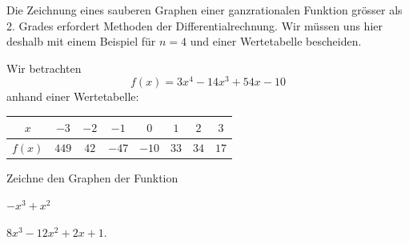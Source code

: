 \documentclass[%
11pt,%
twoside,%
titlepage,%
german,%
headsepline%
]{scrartcl}
\newcommand{\spaltenheight}{\rule{0mm}{3ex}}
\newcommand{\spaltensep}{\\[1ex]}
\begin{document}
Die Zeichnung eines sauberen Graphen einer ganzrationalen Funktion grösser als 2. Grades erfordert Methoden der Differentialrechnung. Wir müssen uns hier deshalb mit einem Beispiel für $n=4$ und einer Wertetabelle bescheiden.

\begin{bsp}
Wir betrachten
$$f(x)=3x^4-14x^3+54x-10$$
anhand einer Wertetabelle:
\begin{table}
\large
\centering
\begin{tabular}{|c|c|c|c|c|c|c|c|} \hline
\rowcolor{Gray}\spaltenheight  $x$ & $-3$ & $-2$ & $-1$ & $0$ & $1$ & $2$ & $3$ \spaltensep \hline
\rowcolor{lightyellow}\spaltenheight $f(x)$ & $449$ & $42$ & $-47$ & $-10$ & $33$ & $34$ & $17$ \spaltensep \hline
\end{tabular}
\end{table}
\end{bsp}


\begin{ueb}[Graphen]
Zeichne den Graphen der Funktion
\begin{enumeratea}
\item $-x^3+x^2$
\item $8x^3-12x^2+2x+1$.
\end{enumeratea}
\end{ueb}
\end{document}
